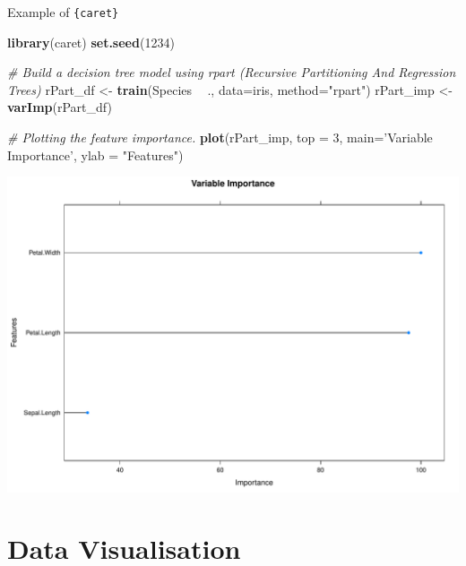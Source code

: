 \documentclass[12pt,ignorenonframetext,]{beamer}
\newenvironment{Shaded}{\begin{snugshade}}{\end{snugshade}}
\newcommand{\CommentTok}[1]{\textcolor[rgb]{0.56,0.35,0.01}{\textit{#1}}}
\newcommand{\DataTypeTok}[1]{\textcolor[rgb]{0.13,0.29,0.53}{#1}}
\newcommand{\DecValTok}[1]{\textcolor[rgb]{0.00,0.00,0.81}{#1}}
\newcommand{\KeywordTok}[1]{\textcolor[rgb]{0.13,0.29,0.53}{\textbf{#1}}}
\newcommand{\NormalTok}[1]{#1}
\newcommand{\OperatorTok}[1]{\textcolor[rgb]{0.81,0.36,0.00}{\textbf{#1}}}
\newcommand{\StringTok}[1]{\textcolor[rgb]{0.31,0.60,0.02}{#1}}
\begin{document}
\begin{frame}[fragile]{Example of \texttt{\{caret\}}}
\protect\hypertarget{example-of-2}{}

\tiny

\begin{Shaded}
\begin{Highlighting}[]
\KeywordTok{library}\NormalTok{(caret)}
\KeywordTok{set.seed}\NormalTok{(}\DecValTok{1234}\NormalTok{)}

\CommentTok{# Build a decision tree model using rpart (Recursive Partitioning And Regression Trees)}
\NormalTok{rPart_df <-}\StringTok{ }\KeywordTok{train}\NormalTok{(Species }\OperatorTok{~}\StringTok{ }\NormalTok{., }\DataTypeTok{data=}\NormalTok{iris, }\DataTypeTok{method=}\StringTok{"rpart"}\NormalTok{)}
\NormalTok{rPart_imp <-}\StringTok{ }\KeywordTok{varImp}\NormalTok{(rPart_df)}

\CommentTok{# Plotting the feature importance.}
\KeywordTok{plot}\NormalTok{(rPart_imp, }\DataTypeTok{top =} \DecValTok{3}\NormalTok{, }\DataTypeTok{main=}\StringTok{'Variable Importance'}\NormalTok{, }\DataTypeTok{ylab =} \StringTok{"Features"}\NormalTok{)}
\end{Highlighting}
\end{Shaded}

\begin{center}\includegraphics[width=0.7\linewidth,height=0.6\textheight]{figs/unnamed-chunk-4} \end{center}

\normalsize

\end{frame}

\hypertarget{data-visualisation}{%
\section{Data Visualisation}\label{data-visualisation}}
\end{document}
